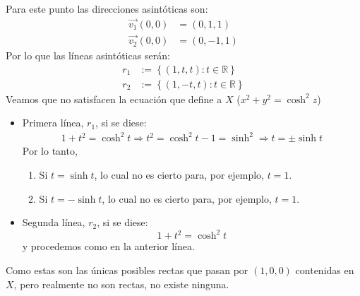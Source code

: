 Para este punto las direcciones asintóticas son:
\begin{align*}
    \overrightarrow{v_1}\left( 0, 0 \right) &= \left( 0, 1, 1 \right) \\
    \overrightarrow{v_2}\left( 0, 0 \right) &= \left( 0, -1, 1 \right)
\end{align*}
Por lo que las líneas asintóticas serán:
\begin{align*}
    r_1 &:= \left\{ \left( 1, t, t \right) : t \in \mathbb{R} \right\}\\
    r_2 &:= \left\{ \left( 1, -t, t \right) : t \in \mathbb{R} \right\}
\end{align*}
Veamos que no satisfacen la ecuación que define a $X$ ($x^2 + y^2 = \cosh^2 z$)
\begin{itemize}
    \item Primera línea, $r_1$, si se diese:
        \begin{align*}
            1 + t^2 = \cosh^2 t \Rightarrow t^2 = \cosh^2 t - 1 = \sinh^2 \Rightarrow t
            = \pm \sinh t
        \end{align*}
        Por lo tanto,
        \begin{enumerate}
            \item Si $t = \sinh t$, lo cual no es cierto para, por ejemplo, $t =
                1$.
            \item Si $t = -\sinh t$, lo cual no es cierto para, por ejemplo, $t
                = 1$.
        \end{enumerate}
    \item Segunda línea, $r_2$, si se diese:
    \[
    1 + t^2 = \cosh^2 t
    \]
    y procedemos como en la anterior línea.
\end{itemize}
Como estas son las únicas posibles rectas que pasan por $\left( 1, 0, 0 \right)$
contenidas en $X$, pero realmente no son rectas, no existe ninguna.
